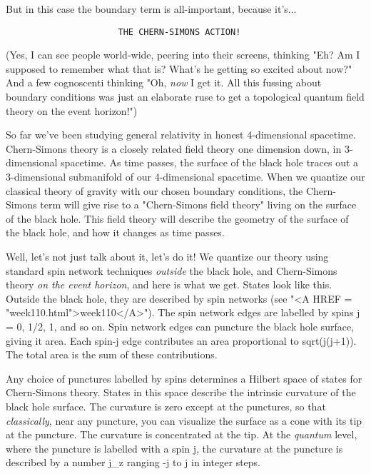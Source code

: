 But in this case the boundary term is all-important, because it's...

\begin{verbatim}
                      THE CHERN-SIMONS ACTION!
\end{verbatim}
    
(Yes, I can see people world-wide, peering into their screens, thinking
"Eh?  Am I supposed to remember what that is?  What's he getting so
excited about now?"  And a few cognoscenti thinking "Oh, \emph{now} I get it.
All this fussing about boundary conditions was just an elaborate ruse to
get a topological quantum field theory on the event horizon!")

So far we've been studying general relativity in honest 4-dimensional
spacetime.  Chern-Simons theory is a closely related field theory one
dimension down, in 3-dimensional spacetime.  As time passes, the surface
of the black hole traces out a 3-dimensional submanifold of our
4-dimensional spacetime.  When we quantize our classical theory of
gravity with our chosen boundary conditions, the Chern-Simons term will
give rise to a "Chern-Simons field theory" living on the surface of the
black hole.  This field theory will describe the geometry of the surface
of the black hole, and how it changes as time passes.

Well, let's not just talk about it, let's do it!  We quantize our theory
using standard spin network techniques \emph{outside} the black hole, and
Chern-Simons theory \emph{on the event horizon}, and here is what we get.
States look like this.  Outside the black hole, they are described by
spin networks (see "<A HREF = "week110.html">week110</A>").  The spin network edges are labelled by
spins j = 0, 1/2, 1, and so on.  Spin network edges can puncture the
black hole surface, giving it area.  Each spin-j edge contributes
an area proportional to sqrt(j(j+1)).  The total area is the sum of
these contributions.

Any choice of punctures labelled by spins determines a Hilbert space of
states for Chern-Simons theory.  States in this space describe the
intrinsic curvature of the black hole surface.  The curvature is zero
except at the punctures, so that \emph{classically}, near any puncture, you
can visualize the surface as a cone with its tip at the puncture.  The
curvature is concentrated at the tip.  At the \emph{quantum} level, where the
puncture is labelled with a spin j, the curvature at the puncture is
described by a number j_{z} ranging -j to j in integer steps.

